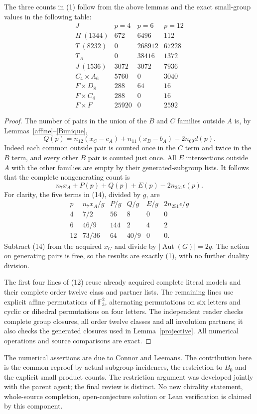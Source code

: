 \documentclass[11pt,a4paper]{article}
\begin{document}
\begin{theorem}
The three counts in (1) follow from the above lemmas and the exact
small-group values in the following table:
\[
\begin{array}{c|rrr}
J&p=4&p=6&p=12\\\hline
H\ (1344)&672&6496&112\\
T\ (8232)&0&268912&67228\\
T_A&0&38416&1372\\
J\ (1536)&3072&3072&7936\\
C_4\times A_6&5760&0&3040\\
F\times D_8&288&64&16\\
F\times C_4&288&0&16\\
F\times F&25920&0&2592
\end{array}                                                   \tag{12}
\]
\end{theorem}
\begin{proof}
The number of pairs in the union of the $B$ and $C$ families outside
$A$ is, by Lemmas~\ref{affine}--\ref{Bunique},
\[
 Q(p)=n_{12}(x_C-c_A)+n_{11}(x_B-b_A)-2n_{69}d(p).             \tag{13}
\]
Indeed each common outside pair is counted once in the $C$ term and
twice in the $B$ term, and every other $B$ pair is counted just once.
All $E$ intersections outside $A$ with the other families are empty
by their generated-subgroup lists. It follows that the complete
nongenerating count is
\[
 n_7x_A+P(p)+Q(p)+E(p)-2n_{251}\epsilon(p).                   \tag{14}
\]
For clarity, the five terms in (14), divided by $g$, are
\[
\begin{array}{c|rrrrr}
p&n_7x_A/g&P/g&Q/g&E/g&2n_{251}\epsilon/g\\\hline
4&7/2&56&8&0&0\\
6&46/9&144&2&4&2\\
12&73/36&64&40/9&0&0.
\end{array}
\]
Subtract (14) from the acquired $x_G$ and divide by
$|\operatorname{Aut}(G)|=2g$. The action on generating pairs is free,
so the results are exactly (1), with no further duality division.

The first four lines of (12) reuse already acquired complete literal
models and their complete order twelve class and partner lists. The
remaining lines use explicit affine permutations of $\mathbb F_3^2$,
alternating permutations on six letters and cyclic or dihedral
permutations on four letters. The independent reader checks complete
group closures, all order twelve classes and all involution partners;
it also checks the generated closures used in Lemma~\ref{projective}.
All numerical operations and source comparisons are exact.
\end{proof}

The numerical assertions are due to Connor and Leemans. The contribution
here is the common reproof by actual subgroup incidences, the restriction
to $B_0$ and the explicit small product counts. The restriction argument
was developed jointly with the parent agent; the final review is distinct.
No new chirality statement, whole-source completion, open-conjecture
solution or Lean verification is claimed by this component.
\end{document}
